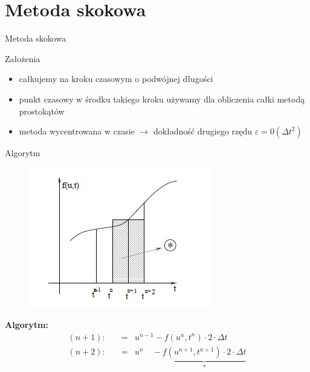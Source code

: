 \section{Metoda skokowa}
\begin{frame}{Metoda skokowa}
	\begin{block}{Założenia}
	\begin{itemize}
	\item całkujemy na  kroku czasowym o podwójnej długości
    \item punkt czasowy w środku takiego kroku używamy dla obliczenia całki metodą prostokątów
    \item metoda wycentrowana w czasie $\rightarrow $ dokładność drugiego rzędu $\varepsilon = 0({\Delta t}^2)$
	\end{itemize}
	\end{block}
\end{frame}
\begin{frame}{Algorytm}
	\begin{figure}
	\includegraphics[height=0.5\textheight]{img/22/metoda_skokowa1.jpg}
	\end{figure}
    \textbf{Algorytm:}
    $$ \begin{array}{rcl}
      (n+1):\quad &=&u^{n-1} -f(u^n,t^n)\cdot 2 \cdot \Delta t\\
      (n+2):\quad &=&u^n \quad -\underbrace{f(u^{n+1},t^{n+1})\cdot 2 \cdot \Delta t}_{\text{*}}
      \end{array} $$
    
\end{frame}

